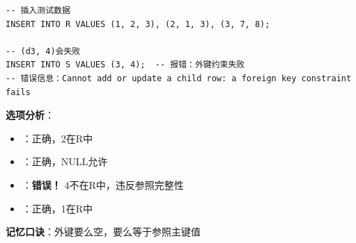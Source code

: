 \documentclass[12pt, a4paper]{article}
\newenvironment{bluebox}[1]{%
  \begin{trivlist}
  \item[\hskip\labelsep \textbf{#1}]
  \setlength{\parskip}{0.5ex}
  \setlength{\itemsep}{0.5ex}
}{%
  \end{trivlist}
  }
\begin{document}
\begin{bluebox}{例题12：参照完整性}
\begin{verbatim}
-- 插入测试数据
INSERT INTO R VALUES (1, 2, 3), (2, 1, 3), (3, 7, 8);

-- (d3, 4)会失败
INSERT INTO S VALUES (3, 4);  -- 报错：外键约束失败
-- 错误信息：Cannot add or update a child row: a foreign key constraint fails
	\end{verbatim}

	\textbf{选项分析}：
	\begin{itemize}[nosep]
		\item[A) (d1, 2)]：正确，2在R中
		\item[B) (d2, NULL)]：正确，NULL允许
		\item[C) (d3, 4)]：\textbf{错误！} 4不在R中，违反参照完整性
		\item[D) (d4, 1)]：正确，1在R中
	\end{itemize}

	\textbf{记忆口诀}：外键要么空，要么等于参照主键值
\end{bluebox}
\end{document}
